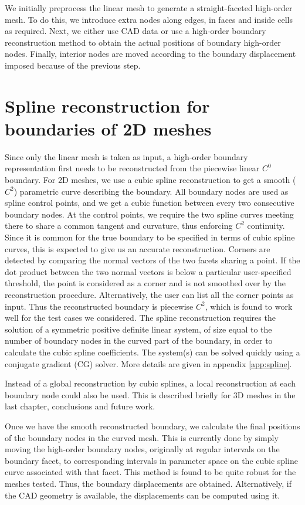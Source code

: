 We initially preprocess the linear mesh to generate a straight-faceted high-order mesh. To do this, we introduce extra nodes along edges, in faces and inside cells as required. Next, we either use CAD data or use a high-order boundary reconstruction method to obtain the actual positions of boundary high-order nodes. Finally, interior nodes are moved according to the boundary displacement imposed because of the previous step.

\section{Spline reconstruction for boundaries of 2D meshes}
\label{subsec:spline2d}
Since only the linear mesh is taken as input, a high-order boundary representation first needs to be reconstructed from the piecewise linear $C^0$ boundary. For 2D meshes, we use a cubic spline reconstruction to get a smooth ($C^2$) parametric curve describing the boundary. All boundary nodes are used as spline control points, and we get a cubic function between every two consecutive boundary nodes. At the control points, we require the two spline curves meeting there to share a common tangent and curvature, thus enforcing $C^2$ continuity. Since it is common for the true boundary to be specified in terms of cubic spline curves, this is expected to give us an accurate reconstruction. Corners are detected by comparing the normal vectors of the two facets sharing a point. If the dot product between the two normal vectors is below a particular user-specified threshold, the point is considered as a corner and is not smoothed over by the reconstruction procedure. Alternatively, the user can list all the corner points as input. Thus the reconstructed boundary is piecewise $C^2$, which is found to work well for the test cases we considered. The spline reconstruction requires the solution of a symmetric positive definite linear system, of size equal to the number of boundary nodes in the curved part of the boundary, in order to calculate the cubic spline coefficients. The system(s) can be solved quickly using a conjugate gradient (CG) solver. More details are given in appendix \ref{app:spline}.

Instead of a global reconstruction by cubic splines, a local reconstruction at each boundary node could also be used. This is described briefly for 3D meshes in the last chapter, conclusions and future work.

Once we have the smooth reconstructed boundary, we calculate the final positions of the boundary nodes in the curved mesh. This is currently done by simply moving the high-order boundary nodes, originally at regular intervals on the boundary facet, to corresponding intervals in parameter space on the cubic spline curve associated with that facet. This method is found to be quite robust for the meshes tested. Thus, the boundary displacements are obtained. Alternatively, if the CAD geometry is available, the displacements can be computed using it.

